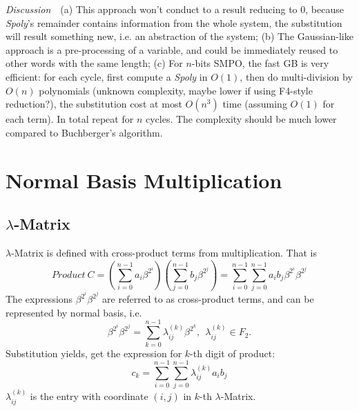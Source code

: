 \documentclass{acm_proc_article-sp}
\begin{document}
\textit{Discussion}\ \ (a) This approach won't conduct to a result reducing to 0, because \emph{Spoly}'s remainder contains information from the whole system,
the substitution will result something new, i.e. an abstraction of the system; (b) The Gaussian-like approach is a pre-processing of a variable, and could be immediately reused
to other words with the same length; (c) For $n$-bits SMPO, the fast GB is very efficient: for each cycle, first compute a \emph{Spoly} in $O(1)$, then do multi-division by $O(n)$ polynomials
(unknown complexity, maybe lower if using F4-style reduction?), the substitution cost at most $O(n^3)$ time (assuming $O(1)$ for each term). In total repeat for $n$ cycles.
The complexity should be much lower compared to Buchberger's algorithm.
%
%
\appendix
\section{Normal Basis Multiplication}
\subsection{$\lambda$-Matrix}
$\lambda$-Matrix is defined with cross-product terms from multiplication. That is 
\begin{displaymath}
Product\ C = (\sum_{i=0}^{n-1}a_i\beta^{2^i})(\sum_{j=0}^{n-1}b_j\beta^{2^j}) = \sum_{i=0}^{n-1}\sum_{j=0}^{n-1}a_ib_j\beta^{2^i}\beta^{2^j}
\end{displaymath}
The expressions $\beta^{2^i}\beta^{2^j}$ are referred to as cross-product terms, and can be represented by
normal basis, i.e.
\begin{displaymath}
\beta^{2^i}\beta^{2^j} = \sum_{k=0}^{n-1}\lambda_{ij}^{(k)}\beta^{2^k}, \ \ \lambda_{ij}^{(k)} \in F_2.
\end{displaymath}
Substitution yields, get the expression for $k$-th digit of product:
\begin{displaymath}
c_k = \sum_{i=0}^{n-1}\sum_{j=0}^{n-1}\lambda_{ij}^{(k)}a_ib_j
\end{displaymath}
$\lambda_{ij}^{(k)}$ is the entry with coordinate $(i,j)$ in $k$-th $\lambda$-Matrix.
\end{document}
